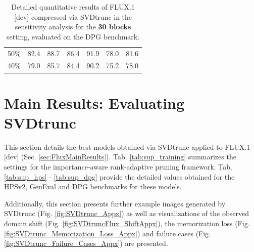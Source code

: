 \begin{table}[H]
{\begin{tabular}{ccccccc}
			50\% &    %
			82.4 &    %
			88.7 &    %
			86.4 &    %
			91.9 &    %
			78.0 &    %
			81.6    %
			\\
			
			40\% &    %
			79.0 &    %
			 85.7 &    %
			84.4 &    %
			90.2 &    %
			75.2 &    %
			78.0     %
			\\
		
			\bottomrule
		\end{tabular}
	}
	\smallskip
	\caption[\gls{SVD}trunc Sensitivity Analysis 30 Blocks: Detailed DPG Results]{Detailed quantitative results of FLUX.1 {[dev]} compressed via \gls{SVD}trunc in the sensitivity analysis for the \textbf{30 blocks} setting, evaluated on the DPG benchmark.}
	\label{tab:dpg_30blocks}
\end{table}



\section{Main Results: Evaluating SVDtrunc}
\label{sec:Appendix_SVDtrunc}
This section details the best models obtained via \gls{SVD}trunc applied to FLUX.1 {[dev]} (Sec. \ref{sec:FluxMainResults}). Tab. \ref{tab:sup_training} summarizes the settings for the importance-aware rank-adaptive pruning framework. Tab. \ref{tab:sup_hps} - \ref{tab:sup_dpg} provide the detailed values obtained for the HPSv2, GenEval and DPG benchmarks for these models. 

Additionally, this section presents further example images generated by \gls{SVD}trunc (Fig. \ref{fig:SVDtrunc_Appx}) as well as visualizations of the observed domain shift (Fig. \ref{fig:SVDtruncFlux_ShiftAppx}), the memorization loss (Fig. \ref{fig:SVDtrunc_Memorization_Loss_Appx}) and failure cases (Fig. \ref{fig:SVDtrunc_Failure_Cases_Appx}) are presented.



